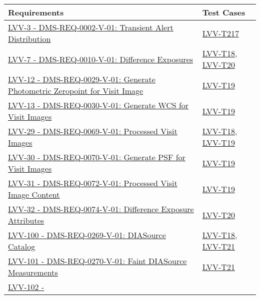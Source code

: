 \begin{longtable}[]{p{13cm}p{3cm}}
\toprule
Requirements & Test Cases\tabularnewline
\midrule
\endhead
\href{https://jira.lsstcorp.org/browse/LVV-3}{LVV-3 - DMS-REQ-0002-V-01:
Transient Alert Distribution} &
\protect\hyperlink{lvv-t217---full-stream-alert-distribution}{LVV-T217}\tabularnewline
\href{https://jira.lsstcorp.org/browse/LVV-7}{LVV-7 - DMS-REQ-0010-V-01:
Difference Exposures} &
\protect\hyperlink{lvv-t18---ag-00-05-alert-generation-produces-required-data-products}{LVV-T18},
\protect\hyperlink{lvv-t20---ag-00-15-scientific-verification-of-difference-images}{LVV-T20}\tabularnewline
\href{https://jira.lsstcorp.org/browse/LVV-12}{LVV-12 -
DMS-REQ-0029-V-01: Generate Photometric Zeropoint for Visit Image} &
\protect\hyperlink{lvv-t19---ag-00-10-scientific-verification-of-processed-visit-images}{LVV-T19}\tabularnewline
\href{https://jira.lsstcorp.org/browse/LVV-13}{LVV-13 -
DMS-REQ-0030-V-01: Generate WCS for Visit Images} &
\protect\hyperlink{lvv-t19---ag-00-10-scientific-verification-of-processed-visit-images}{LVV-T19}\tabularnewline
\href{https://jira.lsstcorp.org/browse/LVV-29}{LVV-29 -
DMS-REQ-0069-V-01: Processed Visit Images} &
\protect\hyperlink{lvv-t18---ag-00-05-alert-generation-produces-required-data-products}{LVV-T18},
\protect\hyperlink{lvv-t19---ag-00-10-scientific-verification-of-processed-visit-images}{LVV-T19}\tabularnewline
\href{https://jira.lsstcorp.org/browse/LVV-30}{LVV-30 -
DMS-REQ-0070-V-01: Generate PSF for Visit Images} &
\protect\hyperlink{lvv-t19---ag-00-10-scientific-verification-of-processed-visit-images}{LVV-T19}\tabularnewline
\href{https://jira.lsstcorp.org/browse/LVV-31}{LVV-31 -
DMS-REQ-0072-V-01: Processed Visit Image Content} &
\protect\hyperlink{lvv-t19---ag-00-10-scientific-verification-of-processed-visit-images}{LVV-T19}\tabularnewline
\href{https://jira.lsstcorp.org/browse/LVV-32}{LVV-32 -
DMS-REQ-0074-V-01: Difference Exposure Attributes} &
\protect\hyperlink{lvv-t20---ag-00-15-scientific-verification-of-difference-images}{LVV-T20}\tabularnewline
\href{https://jira.lsstcorp.org/browse/LVV-100}{LVV-100 -
DMS-REQ-0269-V-01: DIASource Catalog} &
\protect\hyperlink{lvv-t18---ag-00-05-alert-generation-produces-required-data-products}{LVV-T18},
\protect\hyperlink{lvv-t21---ag-00-20-scientific-verification-of-diasource-catalog}{LVV-T21}\tabularnewline
\href{https://jira.lsstcorp.org/browse/LVV-101}{LVV-101 -
DMS-REQ-0270-V-01: Faint DIASource Measurements} &
\protect\hyperlink{lvv-t21---ag-00-20-scientific-verification-of-diasource-catalog}{LVV-T21}\tabularnewline
\href{https://jira.lsstcorp.org/browse/LVV-102}{LVV-102 -
}
\end{longtable}
